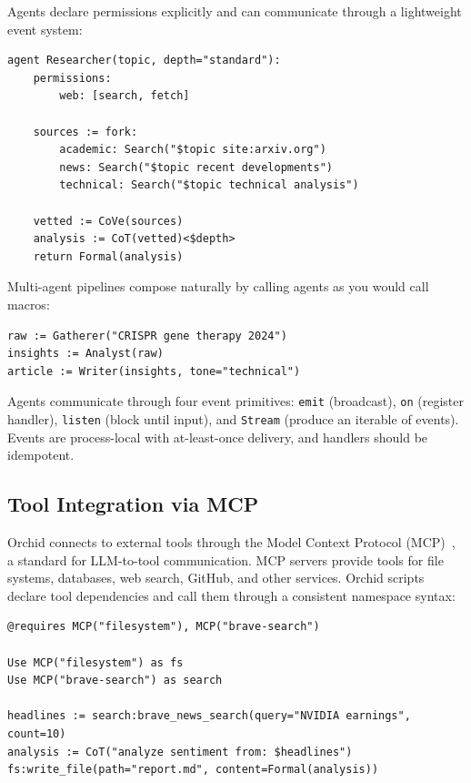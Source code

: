 \documentclass[11pt,a4paper]{article}
\begin{document}
Agents declare permissions explicitly and can communicate through a lightweight event system:

\begin{lstlisting}[language=orchid]
agent Researcher(topic, depth="standard"):
    permissions:
        web: [search, fetch]

    sources := fork:
        academic: Search("$topic site:arxiv.org")
        news: Search("$topic recent developments")
        technical: Search("$topic technical analysis")

    vetted := CoVe(sources)
    analysis := CoT(vetted)<$depth>
    return Formal(analysis)
\end{lstlisting}

Multi-agent pipelines compose naturally by calling agents as you would call macros:

\begin{lstlisting}[language=orchid]
raw := Gatherer("CRISPR gene therapy 2024")
insights := Analyst(raw)
article := Writer(insights, tone="technical")
\end{lstlisting}

Agents communicate through four event primitives: \texttt{emit} (broadcast), \texttt{on} (register handler), \texttt{listen} (block until input), and \texttt{Stream} (produce an iterable of events). Events are process-local with at-least-once delivery, and handlers should be idempotent.

\subsection{Tool Integration via MCP}

Orchid connects to external tools through the Model Context Protocol (MCP)~\citep{mcp}, a standard for LLM-to-tool communication. MCP servers provide tools for file systems, databases, web search, GitHub, and other services. Orchid scripts declare tool dependencies and call them through a consistent namespace syntax:

\begin{lstlisting}[language=orchid]
@requires MCP("filesystem"), MCP("brave-search")

Use MCP("filesystem") as fs
Use MCP("brave-search") as search

headlines := search:brave_news_search(query="NVIDIA earnings", count=10)
analysis := CoT("analyze sentiment from: $headlines")
fs:write_file(path="report.md", content=Formal(analysis))
\end{lstlisting}
\end{document}
